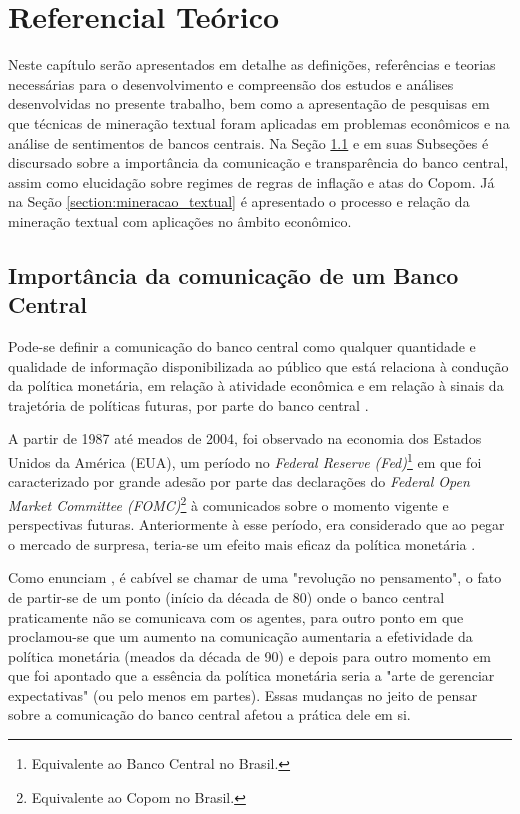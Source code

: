 
\chapter{Referencial Teórico}

Neste capítulo serão apresentados em detalhe as definições, referências e teorias necessárias para o desenvolvimento e compreensão dos estudos e análises desenvolvidas no presente trabalho, bem como a apresentação de pesquisas em que técnicas de mineração textual foram aplicadas em problemas econômicos e na análise de sentimentos de bancos centrais. Na Seção \ref{section:importancia_BC} e em suas Subseções é discursado sobre a importância da comunicação e transparência do banco central, assim como elucidação sobre regimes de regras de inflação e atas do Copom. Já na Seção \ref{section:mineracao_textual} é apresentado o processo e relação da mineração textual com aplicações no âmbito econômico.
 
\section{Importância da comunicação de um Banco Central} \label{section:importancia_BC}

Pode-se definir a comunicação do banco central como qualquer quantidade e qualidade de informação disponibilizada ao público que está relaciona à condução da política monetária, em relação à atividade econômica e em relação à sinais da trajetória de políticas futuras, por parte do banco central \cite{blinder2008central}.

A partir de 1987 até meados de 2004, foi observado na economia dos Estados Unidos da América (EUA), um período no \textit{Federal Reserve (Fed)}\footnote{Equivalente ao Banco Central no Brasil.} em que foi caracterizado por grande adesão por parte das declarações do \textit{Federal Open Market Committee (FOMC)}\footnote{Equivalente ao Copom no Brasil.} à comunicados sobre o momento vigente e perspectivas futuras. Anteriormente à esse período, era considerado que ao pegar o mercado de surpresa, teria-se um efeito mais eficaz da política monetária \cite{woodford2005central}.

Como enunciam , é cabível se chamar de uma "revolução no pensamento", o fato de partir-se de um ponto (início da década de 80) onde o banco central praticamente não se comunicava com os agentes, para outro ponto em que proclamou-se que um aumento na comunicação aumentaria a efetividade da política monetária (meados da década de 90) e depois para outro momento em que foi apontado que a essência da política monetária seria a "arte de gerenciar expectativas" (ou pelo menos em partes). Essas mudanças no jeito de pensar sobre a comunicação do banco central afetou a prática dele em si. 

